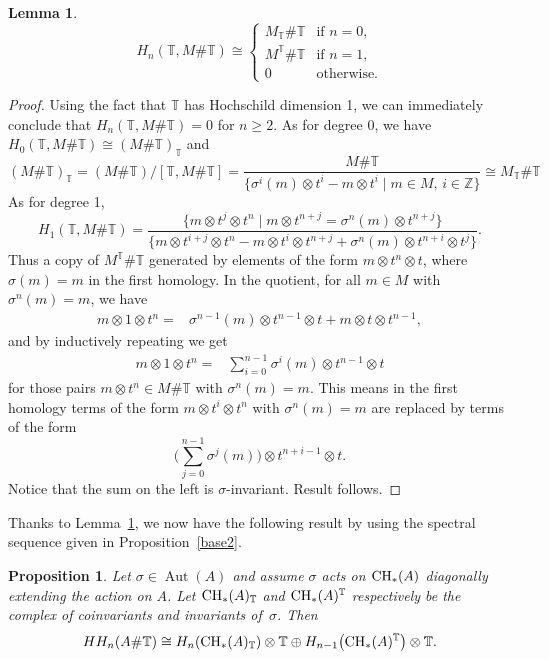 \documentclass[10pt,a4paper]{amsart}
\newcommand{\B}[1]{\mathbb{#1}}
\newcommand{\CH}{{\rm CH}}
\renewcommand{\geq}{\geqslant}
\numberwithin{equation}{section}
\newtheorem{Lemma}[Theorem]{Lemma}
\newtheorem{Proposition}[Theorem]{Proposition}
 { \theoremstyle{definition}
\newtheorem{Definition}[Theorem]{Definition}
\newtheorem{Example}[Theorem]{Example}
\newtheorem{Remark}[Theorem]{Remark} }
\begin{document}
\begin{Lemma}\label{lem:LocalizedCoefficients}
 \begin{equation*}
 H_n(\B{T},M\#\B{T}) \cong
 \begin{cases}
 M_{\B{T}}\#\B{T} & \text{if } n=0,\\
 M^{\B{T}}\#\B{T} & \text{if } n=1,\\
 0 & \text{otherwise.}
 \end{cases}
 \end{equation*}
\end{Lemma}
\begin{proof}
 Using the fact that $\B{T}$ has Hochschild dimension 1, we can immediately conclude that $H_n(\B{T},M\#\B{T})=0$ for $n\geq 2$. As for degree 0, we have
 $H_0(\B{T},M\#\B{T}) \cong (M\#\B{T})_{\B{T}}$ and
 \[ (M\#\B{T})_{\B{T}}
 = (M\#\B{T})/[\B{T},M\# \B{T}]=\frac{M\#\B{T}}{\big\{\sigma^i(m)\otimes t^{i}-m\otimes t^i\mid m\in M,\, i\in\B{Z} \big\}}
 \cong M_{\B{T}}\# \B{T}
 \]
 As for degree 1,
 \[ H_1(\B{T},M\#\B{T})
 = \frac{\big\{m\otimes t^j\otimes t^n\mid m\otimes t^{n+j} = \sigma^{n}(m)\otimes t^{n+j}\big\}}
 {\big\{m\otimes t^{i+j}\otimes t^n - m\otimes t^i\otimes t^{n+j} + \sigma^n(m)\otimes t^{n+i}\otimes t^j \big\} }.
 \]
 Thus a copy of $M^{\B{T}}\#\B{T}$ generated by elements of the form $m\otimes t^n\otimes t$, where
 $\sigma(m)=m$ in the first homology. In the quotient, for all $m\in M$ with $\sigma^n(m)=m$, we
 have
 \begin{align*}
 m\otimes 1\otimes t^n
 = & \sigma^{n-1}(m)\otimes t^{n-1}\otimes t + m\otimes t\otimes t^{n-1},
 \end{align*}
 and by inductively repeating we get
 \begin{align*}
 m\otimes 1\otimes t^n
 = & \sum_{i=0}^{n-1} \sigma^i(m)\otimes t^{n-1}\otimes t
 \end{align*}
 for those pairs $m\otimes t^n\in M\#\B{T}$ with $\sigma^n(m)=m$. This means in the first homology
 terms of the form $m\otimes t^i\otimes t^n$ with $\sigma^n(m)=m$ are replaced by terms of the form
 \[ \Biggl(\sum_{j=0}^{n-1}\sigma^j(m)\Biggr)\otimes t^{n+i-1}\otimes t .
 \]
 Notice that the sum on the left is $\sigma$-invariant. Result follows.
\end{proof}

Thanks to Lemma~\ref{lem:LocalizedCoefficients}, we now have the following result by using
 the spectral sequence given in Proposition~\ref{base2}.
\begin{Proposition}\label{prop:torus-action}
 Let $\sigma\in \operatorname{Aut}(A)$ and assume $\sigma$ acts on $\CH_*(A)$ diagonally extending the
 action on $A$. Let $\CH_*(A)_{\B{T}}$ and $\CH_*(A)^{\B{T}}$ respectively be the complex
 of coinvariants and invariants of~$\sigma$. Then
 \[ HH_n(A\# \B{T})
 \cong H_n(\CH_*(A)_{\B{T}})\otimes \B{T} \oplus H_{n-1}\bigl(\CH_*(A)^{\B{T}}\bigr)\otimes \B{T}.
 \]
\end{Proposition}
\end{document}
